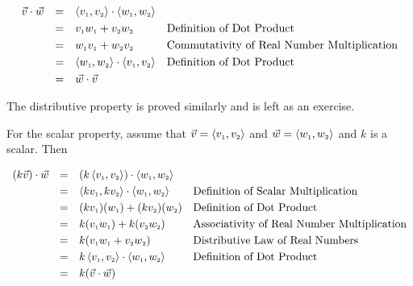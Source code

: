 \documentclass{ximera}
\begin{document}
\[ \begin{array}{rcll}

\vec{v} \cdot \vec{w} & = & \left<v_{\mbox{\tiny $1$}},v_{\mbox{\tiny $2$}}\right>  \cdot \left<w_{\mbox{\tiny $1$}},w_{\mbox{\tiny $2$}}\right>  & \\ [3pt]
										 & = & v_{\mbox{\tiny $1$}}w_{\mbox{\tiny $1$}} + v_{\mbox{\tiny $2$}}w_{\mbox{\tiny $2$}} & \text{Definition of Dot Product} \\ [3pt]
										 & = & w_{\mbox{\tiny $1$}}v_{\mbox{\tiny $1$}} + w_{\mbox{\tiny $2$}}v_{\mbox{\tiny $2$}} & \text{Commutativity of Real Number Multiplication} \\ [3pt]
										 & = & \left<w_{\mbox{\tiny $1$}},w_{\mbox{\tiny $2$}}\right>  \cdot  \left<v_{\mbox{\tiny $1$}},v_{\mbox{\tiny $2$}}\right>  & \text{Definition of Dot Product} \\ [3pt]
										 & = & \vec{w} \cdot \vec{v} & \\ \end{array} \]

The distributive property is proved similarly and is left as an exercise.

\smallskip

For the scalar property, assume that $\vec{v} = \left<v_{\mbox{\tiny $1$}},v_{\mbox{\tiny $2$}}\right>$ and $\vec{w} = \left<w_{\mbox{\tiny $1$}},w_{\mbox{\tiny $2$}}\right>$ and $k$ is a scalar.  Then

\[ \begin{array}{rcll}

(k\vec{v}) \cdot \vec{w} & = & \left(k \left<v_{\mbox{\tiny $1$}},v_{\mbox{\tiny $2$}}\right> \right) \cdot \left<w_{\mbox{\tiny $1$}},w_{\mbox{\tiny $2$}}\right> & \\ [3pt]
												 & = &  \left<kv_{\mbox{\tiny $1$}},kv_{\mbox{\tiny $2$}}\right>  \cdot \left<w_{\mbox{\tiny $1$}},w_{\mbox{\tiny $2$}}\right> & \text{Definition of Scalar Multiplication} \\ [3pt]
												 & = & (kv_{\mbox{\tiny $1$}})(w_{\mbox{\tiny $1$}}) + (kv_{\mbox{\tiny $2$}})(w_{\mbox{\tiny $2$}}) & \text{Definition of Dot Product} \\ [3pt]
												 & = & k(v_{\mbox{\tiny $1$}}w_{\mbox{\tiny $1$}}) + k(v_{\mbox{\tiny $2$}}w_{\mbox{\tiny $2$}}) & \text{Associativity of Real Number Multiplication} \\ [3pt]
												 & = & k(v_{\mbox{\tiny $1$}}w_{\mbox{\tiny $1$}} + v_{\mbox{\tiny $2$}}w_{\mbox{\tiny $2$}}) & \text{Distributive Law of Real Numbers} \\ [3pt]
												 & = & k \left<v_{\mbox{\tiny $1$}},v_{\mbox{\tiny $2$}}\right>  \cdot \left<w_{\mbox{\tiny $1$}},w_{\mbox{\tiny $2$}}\right> & \text{Definition of Dot Product} \\ [3pt]
												 & = & k (\vec{v} \cdot \vec{w}) & \\ \end{array} \]
\end{document}
